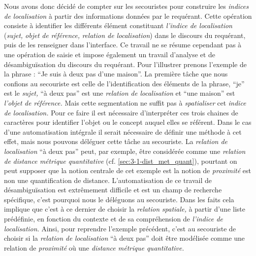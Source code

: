 Nous avons donc décidé de compter sur les secouristes pour construire
les \emph{indices de localisation} à partir des informations données
par le requérant. Cette opération consiste à identifier les différents
élément constituant \emph{l'indice de localisation} (\emph{sujet,}
\emph{objet de référence,} \emph{relation de localisation}) dans le
discours du requérant, puis de les renseigner dans l'interface. Ce
travail ne se résume cependant pas à une opération de saisie et impose
également un travail d'analyse et de désambiguïsation du discours du
requérant. Pour l'illustrer prenons l'exemple de la phrase :
\enquote{Je suis à deux pas d'une maison}. La première tâche que nous
confions au secouriste est celle de l'identification des éléments de
la phrase, \enquote{je} est le \emph{sujet,} \enquote{à deux pas} est
une \emph{relation de localisation} et \enquote{une maison} est
\emph{l'objet de référence.} Mais cette segmentation ne suffit pas à
\emph{spatialiser} cet \emph{indice de localisation.} Pour ce faire il
est nécessaire d'interpréter ces trois chaines de caractères pour
identifier l'objet ou le concept auquel elles se référent. Dans le cas
d'une automatisation intégrale il serait nécessaire de définir une
méthode à cet effet, mais nous pouvons déléguer cette tâche au
secouriste. La \emph{relation de localisation} \enquote{à deux pas}
peut, par exemple, être considérée comme une \emph{relation de
  distance métrique quantitative} (cf. \ref{sec:3-1-dist_met_quant}),
pourtant on peut supposer que la notion centrale de cet exemple est la
notion de \emph{proximité} est non une quantification de
distance. L'automatisation de ce travail de désambiguïsation est
extrêmement difficile et est un champ de recherche spécifique, c'est
pourquoi nous le déléguons au secouriste. Dans les faits cela implique
que c'est à ce dernier de choisir la \emph{relation spatiale,} à
partir d'une liste prédéfinie, en fonction du contexte et de sa
compréhension de \emph{l'indice de localisation}. Ainsi, pour
reprendre l'exemple précédent, c'est au secouriste de choisir si la
\emph{relation de localisation} \enquote{à deux pas} doit être
modélisée comme une relation de \emph{proximité} où une \emph{distance
  métrique quantitative.}

